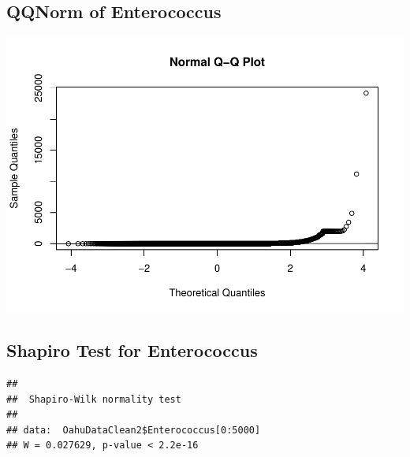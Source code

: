 \documentclass[12pt,]{article}
\newenvironment{Shaded}{\begin{snugshade}}{\end{snugshade}}
\newcommand{\KeywordTok}[1]{\textcolor[rgb]{0.13,0.29,0.53}{\textbf{#1}}}
\newcommand{\DecValTok}[1]{\textcolor[rgb]{0.00,0.00,0.81}{#1}}
\newcommand{\OperatorTok}[1]{\textcolor[rgb]{0.81,0.36,0.00}{\textbf{#1}}}
\newcommand{\NormalTok}[1]{#1}
\begin{document}
\subsection{QQNorm of Enterococcus}\label{qqnorm-of-enterococcus}

\begin{Shaded}
\end{Shaded}

\includegraphics{Garcia_ENV872_Project_files/figure-latex/unnamed-chunk-51-1.pdf}

\subsection{Shapiro Test for
Enterococcus}\label{shapiro-test-for-enterococcus}

\begin{Shaded}
\end{Shaded}

\begin{verbatim}
## 
##  Shapiro-Wilk normality test
## 
## data:  OahuDataClean2$Enterococcus[0:5000]
## W = 0.027629, p-value < 2.2e-16
\end{verbatim}
\end{document}
